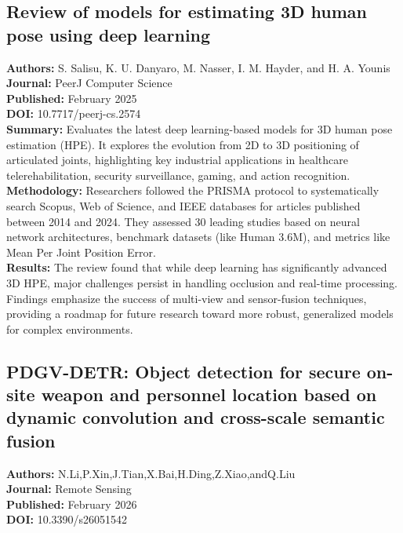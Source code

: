 \subsection{Review of models for estimating 3D human pose using deep learning}

\textbf{Authors:} S. Salisu, K. U. Danyaro, M. Nasser, I. M. Hayder, and H. A. Younis \\
\textbf{Journal:} PeerJ Computer Science \\
\textbf{Published:} February 2025 \\
\textbf{DOI:} 10.7717/peerj-cs.2574 \\

\textbf{Summary:} Evaluates the latest deep learning-based models for 3D human pose estimation
(HPE). It explores the evolution from 2D to 3D positioning of articulated joints, highlighting key
industrial applications in healthcare telerehabilitation, security surveillance, gaming, and action
recognition. \\

\textbf{Methodology:} Researchers followed the PRISMA protocol to systematically search Scopus, Web
of Science, and IEEE databases for articles published between 2014 and 2024. They assessed 30
leading studies based on neural network architectures, benchmark datasets (like Human 3.6M), and
metrics like Mean Per Joint Position Error. \\

\textbf{Results:} The review found that while deep learning has significantly advanced 3D HPE, major
challenges persist in handling occlusion and real-time processing. Findings emphasize the success of
multi-view and sensor-fusion techniques, providing a roadmap for future research toward more robust,
generalized models for complex environments.

\subsection{PDGV-DETR: Object detection for secure on-site weapon and personnel location based on
  dynamic convolution and cross-scale semantic fusion}

\textbf{Authors:} N.Li,P.Xin,J.Tian,X.Bai,H.Ding,Z.Xiao,andQ.Liu \\
\textbf{Journal:} Remote Sensing \\
\textbf{Published:} February 2026 \\
\textbf{DOI:} 10.3390/s26051542 \\

